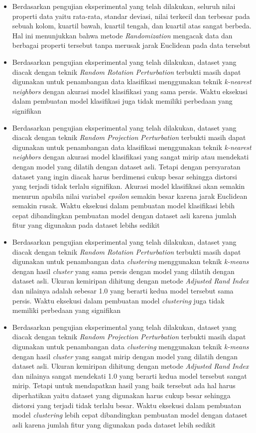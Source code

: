 \begin{itemize}
    \item Berdasarkan pengujian eksperimental yang telah dilakukan, seluruh nilai properti data yaitu rata-rata, standar deviasi, nilai terkecil dan terbesar pada sebuah kolom, kuartil bawah, kuartil tengah, dan kuartil atas sangat berbeda. Hal ini menunjukkan bahwa metode \textit{Randomization} mengacak data dan berbagai properti tersebut tanpa merusak jarak Euclidean pada data tersebut
    \item Berdasarkan pengujian eksperimental yang telah dilakukan, dataset yang diacak dengan teknik \textit{Random Rotation Perturbation} terbukti masih dapat digunakan untuk penambangan data klasifikasi menggunakan teknik \textit{k-nearest neighbors} dengan akurasi model klasifikasi yang sama persis. Waktu eksekusi dalam pembuatan model klasifikasi juga tidak memiliki perbedaan yang signifikan
    \item Berdasarkan pengujian eksperimental yang telah dilakukan, dataset yang diacak dengan teknik \textit{Random Projection Perturbation} terbukti masih dapat digunakan untuk penambangan data klasifikasi menggunakan teknik \textit{k-nearest neighbors} dengan akurasi model klasifikasi yang sangat mirip atau mendekati dengan model yang dilatih dengan dataset asli. Tetapi dengan persyaratan dataset yang ingin diacak harus berdimensi cukup besar sehingga distorsi yang terjadi tidak terlalu signifikan. Akurasi model klasifikasi akan semakin menurun apabila nilai variabel \textit{epsilon} semakin besar karena jarak Euclidean semakin rusak. Waktu eksekusi dalam pembuatan model klasifikasi lebih cepat dibandingkan pembuatan model dengan dataset asli karena jumlah fitur yang digunakan pada dataset lebihs sedikit
    \item Berdasarkan pengujian eksperimental yang telah dilakukan, dataset yang diacak dengan teknik \textit{Random Rotation Perturbation} terbukti masih dapat digunakan untuk penambangan data \textit{clustering} menggunakan teknik \textit{k-means} dengan hasil \textit{cluster} yang sama persis dengan model yang dilatih dengan dataset asli. Ukuran kemiripan dihitung dengan metode \textit{Adjusted Rand Index} dan nilainya adalah sebesar 1.0 yang berarti kedua model tersebut sama persis. Waktu eksekusi dalam pembuatan model \textit{clustering} juga tidak memiliki perbedaan yang signifikan
    \item Berdasarkan pengujian eksperimental yang telah dilakukan, dataset yang diacak dengan teknik \textit{Random Projection Perturbation} terbukti masih dapat digunakan untuk penambangan data \textit{clustering} menggunakan teknik \textit{k-means} dengan hasil \textit{cluster} yang sangat mirip dengan model yang dilatih dengan dataset asli. Ukuran kemiripan dihitung dengan metode \textit{Adjusted Rand Index} dan nilainya sangat mendekati 1.0 yang berarti kedua model tersebut sangat mirip. Tetapi untuk mendapatkan hasil yang baik tersebut ada hal harus diperhatikan yaitu dataset yang digunakan harus cukup besar sehingga distorsi yang terjadi tidak terlalu besar. Waktu eksekusi dalam pembuatan model \textit{clustering} lebih cepat dibandingkan pembuatan model dengan dataset asli karena jumlah fitur yang digunakan pada dataset lebih sedikit
\end{itemize}

